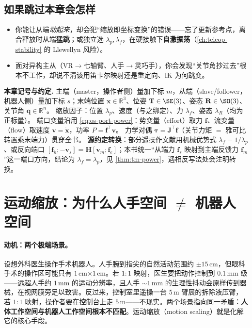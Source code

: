 \subsection*{如果跳过本章会怎样}
\begin{itemize}
  \item 你能让从端\emph{动起来}，却会犯“缩放即坐标变换”的错误——忘了更新参考点，离合释放时从端\textbf{猛跳}；或独立选 $\lambda_p,\lambda_f$，在硬接触下\textbf{自激振荡}（\cref{ch:teleop-stability} 的 Llewellyn 风险）。
  \item 面对异构主从（VR$\to$七轴臂、人手$\to$灵巧手），你会发现“关节角抄过去”根本不工作，却说不清该用笛卡尔映射还是重定向、IK 为何跳变。
\end{itemize}

\begin{note}
\textbf{本章记号与约定.}\;
主端（master，操作者侧）量加下标 $m$，从端（slave/follower，机器人侧）量加下标 $s$；末端位置 $\mathbf{x}\in\mathbb{R}^3$、位姿 $\mathbf{T}\in\SE(3)$、姿态 $\mathbf{R}\in\SO(3)$、关节角 $\mathbf{q}\in\mathbb{R}^n$。
缩放因子：位置 $\lambda_p$、速度（与之绑定）、力 $\lambda_f$、姿态 $\lambda_R$（均为正标量）。
端口变量沿用 \cref{eq:os-port-power}：势变量（effort）取力 $\mathbf{f}$、流变量（flow）取速度 $\mathbf{v}=\dot{\mathbf{x}}$，功率 $P=\mathbf{f}^\top\mathbf{v}$。
力学对偶 $\boldsymbol{\tau}=\mathbf{J}^\top\mathbf{f}$（关节力矩 $=$ 雅可比转置乘末端力）贯穿全书。
\textbf{源约定转换}：部分遥操作文献用机械优势式 $\lambda_f=1/\lambda_p$、或反向端口 $[\mathbf{f}_h;-\mathbf{v}_s]=\mathbf{H}[\mathbf{v}_m;\mathbf{f}_e]$；本书统一“从端力 $\mathbf{f}_s$ 映射到主端反馈力 $\mathbf{f}_m$”这一端口方向，结论为 $\lambda_f=\lambda_p$，见 \cref{thm:tm-power}，遇相反写法处会注明转换。
\end{note}

\section{运动缩放：为什么人手空间 \texorpdfstring{$\neq$}{!=} 机器人空间}
\label{sec:tm-scaling}

\paragraph{动机：两个极端场景。}
设想外科医生操作手术机器人。人手腕到指尖的自然活动范围约 $\pm 15\,$cm，但眼科手术的操作区可能只有 $1\,$cm$\times 1\,$cm。若 $1{:}1$ 映射，医生要把动作控制到 $0.1\,$mm 级——远超人手约 $1\,$mm 的运动分辨率，且人手 $\sim\!1\,$mm 的生理性抖动会原样传到器械，在视网膜旁足以致害。反过来，控制室里遥操一台 $5\,$m 臂展的拆除液压臂，若 $1{:}1$ 映射，操作者要在控制台上走 $5\,$m——不现实。两个场景指向同一矛盾：\textbf{人体工作空间与机器人工作空间根本不匹配}。运动缩放（motion scaling）就是化解它的核心手段。

